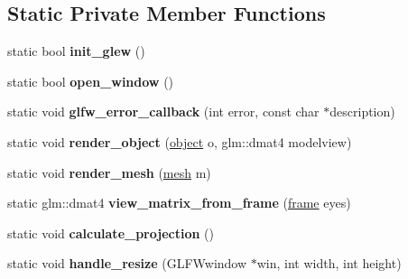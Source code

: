 \subsection*{Static Private Member Functions}
\begin{DoxyCompactItemize}
\item 
\hypertarget{class_render_manager_a6ca72efe9121ca71e1607b3fcf34e259}{}static bool {\bfseries init\+\_\+glew} ()\label{class_render_manager_a6ca72efe9121ca71e1607b3fcf34e259}

\item 
\hypertarget{class_render_manager_aea13b14315bf805e3c4c3c1558396ca0}{}static bool {\bfseries open\+\_\+window} ()\label{class_render_manager_aea13b14315bf805e3c4c3c1558396ca0}

\item 
\hypertarget{class_render_manager_a34a75100537aa9fc17b2f3026a8926b1}{}static void {\bfseries glfw\+\_\+error\+\_\+callback} (int error, const char $\ast$description)\label{class_render_manager_a34a75100537aa9fc17b2f3026a8926b1}

\item 
\hypertarget{class_render_manager_a16d86e974fc806c625cc58f3f35e30df}{}static void {\bfseries render\+\_\+object} (\hyperlink{structobject}{object} o, glm\+::dmat4 modelview)\label{class_render_manager_a16d86e974fc806c625cc58f3f35e30df}

\item 
\hypertarget{class_render_manager_a9304e97c328fd45ca10f3818e6a541ef}{}static void {\bfseries render\+\_\+mesh} (\hyperlink{structmesh}{mesh} m)\label{class_render_manager_a9304e97c328fd45ca10f3818e6a541ef}

\item 
\hypertarget{class_render_manager_af785cb56dfefe97db53bf34e76b80234}{}static glm\+::dmat4 {\bfseries view\+\_\+matrix\+\_\+from\+\_\+frame} (\hyperlink{structframe}{frame} eyes)\label{class_render_manager_af785cb56dfefe97db53bf34e76b80234}

\item 
\hypertarget{class_render_manager_ab5a19466eafdba8f2458bd3678969363}{}static void {\bfseries calculate\+\_\+projection} ()\label{class_render_manager_ab5a19466eafdba8f2458bd3678969363}

\item 
\hypertarget{class_render_manager_a848eb5da3a3a56c66fba137719e412f4}{}static void {\bfseries handle\+\_\+resize} (G\+L\+F\+Wwindow $\ast$win, int width, int height)\label{class_render_manager_a848eb5da3a3a56c66fba137719e412f4}

\end{DoxyCompactItemize}

